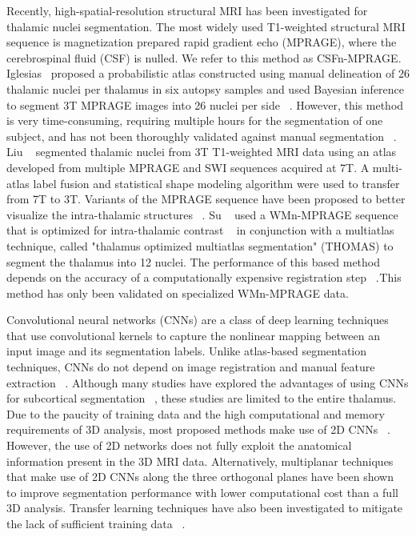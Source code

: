 \documentclass[3p,,final,12pt]{elsarticle}
\begin{document}
Recently, high-spatial-resolution structural MRI has been investigated for thalamic nuclei segmentation. The most widely used T1-weighted structural MRI sequence is magnetization prepared rapid gradient echo (MPRAGE), where the cerebrospinal fluid (CSF) is nulled. We refer to this method as CSFn-MPRAGE. Iglesias\unskip~\cite{1643371:26789917} proposed a probabilistic atlas constructed using manual delineation of 26 thalamic nuclei per thalamus in six autopsy samples and used Bayesian inference to segment 3T MPRAGE images into 26 nuclei per side \unskip~\cite{1643371:26789932,1643371:26789914}. However, this method is very time-consuming, requiring multiple hours for the segmentation of one subject, and has not been thoroughly validated against manual segmentation \unskip~\cite{1643371:26789917}. Liu \unskip~\cite{1643371:26789952} segmented thalamic nuclei from 3T T1-weighted MRI data using an atlas developed from multiple MPRAGE and SWI sequences acquired at 7T. A multi-atlas label fusion and statistical shape modeling algorithm were used to transfer from 7T to 3T. Variants of the MPRAGE sequence have been proposed to better visualize the intra-thalamic structures \unskip~\cite{1643371:26789957,1643371:26789954}. Su \unskip~\cite{1643371:26789960} used a WMn-MPRAGE sequence that is optimized for intra-thalamic contrast \unskip~\cite{1643371:26789961} in conjunction with a multiatlas technique, called "thalamus optimized multiatlas segmentation" (THOMAS) to segment the thalamus into 12 nuclei. The performance of this based method depends on the accuracy of a computationally expensive registration step \unskip~\cite{1643371:26789917,1643371:26789939}.\ensuremath{^{}}This method has only been validated on specialized WMn-MPRAGE data.

Convolutional neural networks (CNNs) are a class of deep learning techniques that use convolutional kernels to capture the nonlinear mapping between an input image and its segmentation labels. Unlike atlas-based segmentation techniques, CNNs do not depend on image registration and manual feature extraction \unskip~\cite{1643371:26789908}. Although many studies have explored the advantages of using CNNs for subcortical segmentation \unskip~\cite{1643371:26789955,1643371:26789913,1643371:26789947,1643371:26789902}, these studies are limited to the entire thalamus. Due to the paucity of training data and the high computational and memory requirements of 3D analysis, most proposed methods make use of 2D CNNs \unskip~\cite{1643371:26789947}. However, the use of 2D networks does not fully exploit the anatomical information present in the 3D MRI data. Alternatively, multiplanar techniques that make use of 2D CNNs along the three orthogonal planes have been shown \unskip~\cite{1643371:26789913,1643371:26789921,1643371:26789904,1643371:26789950}\ensuremath{^{}}to improve segmentation performance with lower computational cost than a full 3D analysis. Transfer learning techniques have also been investigated to mitigate the lack of sufficient training data \unskip~\cite{1643371:26789942}.
\end{document}

